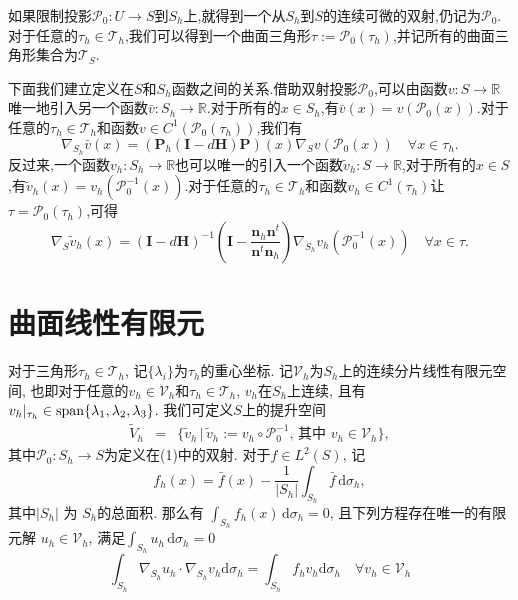 \documentclass{article}
\begin{document}
如果限制投影$\mathcal{P}_0:U\rightarrow S$到$S_h$上,就得到一个从$S_h$到$S$的连续可微的双射,仍记为$\mathcal{P}_0$.对于任意的$\tau_h\in\mathcal{T}_h$,我们可以得到一个曲面三角形$\tau:=\mathcal{P}_0(\tau_h)$,并记所有的曲面三角形集合为$\mathcal{T}_S$.

下面我们建立定义在$S$和$S_h$函数之间的关系.借助双射投影$\mathcal{P}_0$,可以由函数$v:S\rightarrow\mathbb{R}$唯一地引入另一个函数$\bar{v}:S_h\rightarrow\mathbb{R}$.对于所有的$x\in S_h$,有$\bar{v}(x)=v(\mathcal{P}_0(x))$.对于任意的$\tau_h\in\mathcal{T}_h$和函数$v\in C^1(\mathcal{P}_0(\tau_h))$,我们有
\begin{equation*}
\nabla_{S_h}\bar{v}(x)=(\boldsymbol{P}_h(\boldsymbol{I}-d\boldsymbol{H})\boldsymbol{P})(x)\nabla_{S}v(\mathcal{P}_0(x))\quad\forall x\in \tau_h.
\end{equation*}
反过来,一个函数$v_h:S_h\rightarrow\mathbb{R}$也可以唯一的引入一个函数$\tilde{v}_h:S\rightarrow\mathbb{R}$,对于所有的$x\in S$,有$\tilde{v}_h(x)=v_h(\mathcal{P}^{-1}_0(x))$.对于任意的$\tau_h\in\mathcal{T}_h$和函数$v_h\in C^1(\tau_h)$让$\tau=\mathcal{P}_0(\tau_h)$,可得
\begin{equation*}
\nabla_{S}\tilde{v}_h(x)=(\boldsymbol{I}-d\boldsymbol{H})^{-1}\left(\boldsymbol{I}-\frac{\boldsymbol{n}_h\boldsymbol{n}^t}{\boldsymbol{n}^t\boldsymbol{n}_h}\right)\nabla_{S_h}v_h(\mathcal{P}^{-1}_0(x))\quad\forall x\in\tau.
\end{equation*}

\section{曲面线性有限元}

对于三角形$\tau_h\in\mathcal{T}_h$, 记$\{\lambda_i\}$为$\tau_h$的重心坐标.   
记$\mathcal V_h$为$S_h$上的连续分片线性有限元空间, 也即对于任意的$v_h\in \mathcal V_h$和$\tau_h \in \mathcal T_h$,
$v_h$在$S_h$上连续, 且有$v_h|_{\tau_h}\in {\rm span}\{\lambda_1,\lambda_2,\lambda_3\}$.  
我们可定义$S$上的提升空间
\begin{eqnarray*}
 \tilde{V}_{h} & = &
\{\tilde{v}_{h} \, | \, \tilde{v}_{h}:=v_{h}\circ\mathcal{P}_{0}^{-1},\,
\text{其中 }v_{h}\in \mathcal V_h\},
\end{eqnarray*}
其中$\mathcal P_0: S_h \to S$为定义在(1)中的双射.   
对于$f\in L^{2}(S)$, 记
\begin{equation}\label{eq:fh}
f_{h}(x)=\bar{f}(x)-\frac{1}{|S_{h}|}\int_{S_{h}} \bar f \, \mathrm{d}\sigma_{h},
\end{equation}
其中$|S_{h}|$ 为 $ S_{h}$的总面积. 那么有
$\int_{S_{h}}f_{h}(x)\,\mathrm{d}\sigma_{h}=0$, 且下列方程存在唯一的有限元解
$u_{h}\in \mathcal V_h$, 满足$\int_{S_{h}}u_{h}\,\mathrm{d}\sigma_{h}=0$
\begin{equation*}
\int_{S_h}\nabla_{S_h}u_h\cdot\nabla_{S_h}v_h\mathrm{d}\sigma_h=\int_{S_h}f_hv_h\mathrm{d}\sigma_h\quad\forall v_h\in\mathcal{V}_h
\end{equation*}
\end{document}
